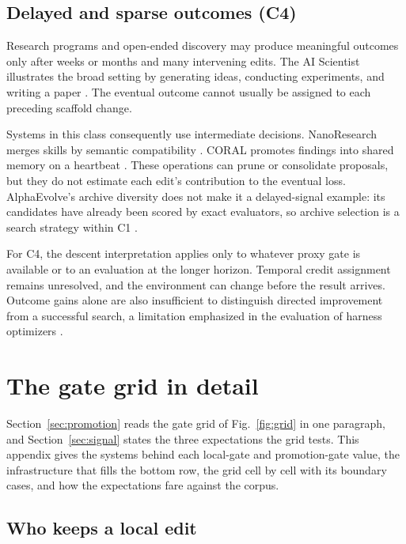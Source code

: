 \subsection{Delayed and sparse outcomes (C4)}\label{delayed-and-sparse-outcomes-c4}

Research programs and open-ended discovery may produce meaningful outcomes only after weeks or months and many intervening edits. The AI Scientist illustrates the broad setting by generating ideas, conducting experiments, and writing a paper \citep{lu2024aiscientist}. The eventual outcome cannot usually be assigned to each preceding scaffold change.

Systems in this class consequently use intermediate decisions. NanoResearch merges skills by semantic compatibility \citep{xu2026nanoresearch}. CORAL promotes findings into shared memory on a heartbeat \citep{qu2026coral}. These operations can prune or consolidate proposals, but they do not estimate each edit's contribution to the eventual loss. AlphaEvolve's archive diversity does not make it a delayed-signal example: its candidates have already been scored by exact evaluators, so archive selection is a search strategy within C1 \citep{alphaevolve2025}.

For C4, the descent interpretation applies only to whatever proxy gate is available or to an evaluation at the longer horizon. Temporal credit assignment remains unresolved, and the environment can change before the result arrives. Outcome gains alone are also insufficient to distinguish directed improvement from a successful search, a limitation emphasized in the evaluation of harness optimizers \citep{ong2026harnesseval}.

\section{The gate grid in detail}\label{app:grid}

Section~\ref{sec:promotion} reads the gate grid of Fig.~\ref{fig:grid} in one paragraph, and Section~\ref{sec:signal} states the three expectations the grid tests. This appendix gives the systems behind each local-gate and promotion-gate value, the infrastructure that fills the bottom row, the grid cell by cell with its boundary cases, and how the expectations fare against the corpus.

\subsection{Who keeps a local edit}\label{who-keeps-a-local-edit}

